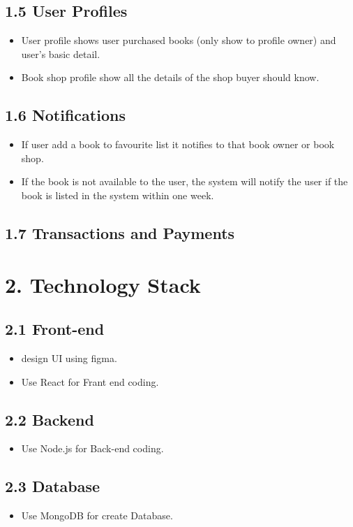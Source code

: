 \documentclass[english,10pt,a4paper]{article}
\begin{document}
		\subsection*{1.5 User Profiles}
			\begin{itemize}
				\item User profile shows user purchased books (only show to profile owner) and user’s basic detail.
				\item Book shop profile show all the details of the shop buyer should know.
			\end{itemize}
		\subsection*{1.6 Notifications}
			\begin{itemize}
				\item If user add a book to favourite list it notifies to that book owner or book shop. 
				\item If the book is not available to the user, the system will notify the user if the book is listed in the system within one week.
			\end{itemize}
		\subsection*{1.7 Transactions and Payments}
		
		
	\section*{2. Technology Stack}
		\subsection*{2.1 Front-end}	
			\begin{itemize}
				\item design UI using figma. 
				\item Use React for Frant end coding.
			\end{itemize}
		\subsection*{2.2 Backend}
			\begin{itemize}
				\item Use Node.js for Back-end coding. 
			\end{itemize}
		\subsection*{2.3 Database}
			\begin{itemize}
				\item Use MongoDB for create Database. 
			\end{itemize}
\end{document}
